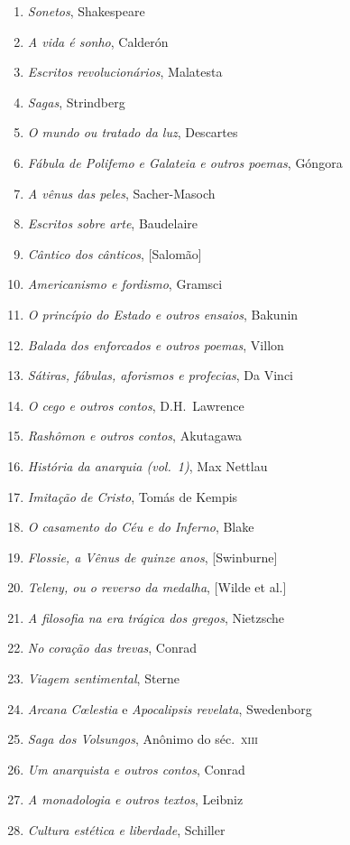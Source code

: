 \begin{enumerate}
\item \textit{Sonetos}, Shakespeare
\item \textit{A vida é sonho}, Calderón
\item \textit{Escritos revolucionários}, Malatesta
\item \textit{Sagas}, Strindberg
\item \textit{O mundo ou tratado da luz}, Descartes
\item \textit{Fábula de Polifemo e Galateia e outros poemas}, Góngora
\item \textit{A vênus das peles}, Sacher{}-Masoch
\item \textit{Escritos sobre arte}, Baudelaire
\item \textit{Cântico dos cânticos}, [Salomão]
\item \textit{Americanismo e fordismo}, Gramsci
\item \textit{O princípio do Estado e outros ensaios}, Bakunin
\item \textit{Balada dos enforcados e outros poemas}, Villon
\item \textit{Sátiras, fábulas, aforismos e profecias}, Da Vinci
\item \textit{O cego e outros contos}, D.H.~Lawrence
\item \textit{Rashômon e outros contos}, Akutagawa
\item \textit{História da anarquia (vol.~1)}, Max Nettlau
\item \textit{Imitação de Cristo}, Tomás de Kempis
\item \textit{O casamento do Céu e do Inferno}, Blake
\item \textit{Flossie, a Vênus de quinze anos}, [Swinburne]
\item \textit{Teleny, ou o reverso da medalha}, [Wilde et al.]
\item \textit{A filosofia na era trágica dos gregos}, Nietzsche
\item \textit{No coração das trevas}, Conrad
\item \textit{Viagem sentimental}, Sterne
\item \textit{Arcana C\oe lestia} e \textit{Apocalipsis revelata}, Swedenborg
\item \textit{Saga dos Volsungos}, Anônimo do séc.~\textsc{xiii}
\item \textit{Um anarquista e outros contos}, Conrad
\item \textit{A monadologia e outros textos}, Leibniz
\item \textit{Cultura estética e liberdade}, Schiller

\end{enumerate}
